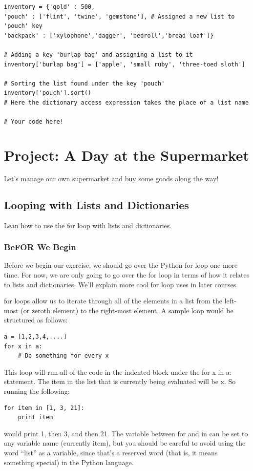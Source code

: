 \documentclass[12pt,a4paper,final,twoside,onecolumn,titlepage]{book}
\begin{document}
\begin{lstlisting}
inventory = {'gold' : 500,
'pouch' : ['flint', 'twine', 'gemstone'], # Assigned a new list to 'pouch' key
'backpack' : ['xylophone','dagger', 'bedroll','bread loaf']}

# Adding a key 'burlap bag' and assigning a list to it
inventory['burlap bag'] = ['apple', 'small ruby', 'three-toed sloth']

# Sorting the list found under the key 'pouch'
inventory['pouch'].sort() 
# Here the dictionary access expression takes the place of a list name 

# Your code here!

\end{lstlisting}


\chapter{Project: A Day at the Supermarket}
Let's manage our own supermarket and buy some goods along the way!

\section{Looping with Lists and Dictionaries}
Lean how to use the for loop with lists and dictionaries.
\subsection{BeFOR We Begin}

Before we begin our exercise, we should go over the Python for loop one more time. For now, we are only going to go over the for loop in terms of how it relates to lists and dictionaries. We'll explain more cool for loop uses in later courses.

for loops allow us to iterate through all of the elements in a list from the left-most (or zeroth element) to the right-most element. A sample loop would be structured as follows:

\begin{lstlisting}
a = [1,2,3,4,....]
for x in a: 
    # Do something for every x
\end{lstlisting}

This loop will run all of the code in the indented block under the for x in a: statement. The item in the list that is currently being evaluated will be x. So running the following:
\begin{lstlisting}
for item in [1, 3, 21]: 
    print item
\end{lstlisting}
would print 1, then 3, and then 21. The variable between for and in can be set to any variable name (currently item), but you should be careful to avoid using the word “list” as a variable, since that's a reserved word (that is, it means something special) in the Python language.
\end{document}
